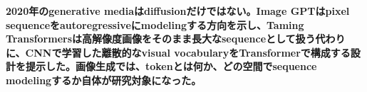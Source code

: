 \noindent\textbf{2020年のgenerative mediaはdiffusionだけではない。Image GPTはpixel sequenceをautoregressiveにmodelingする方向を示し、Taming Transformersは高解像度画像をそのまま長大なsequenceとして扱う代わりに、CNNで学習した離散的なvisual vocabularyをTransformerで構成する設計を提示した。画像生成では、tokenとは何か、どの空間でsequence modelingするか自体が研究対象になった。}\autocite{src-03b656c5d291,src-d46ff01d5c8d}

